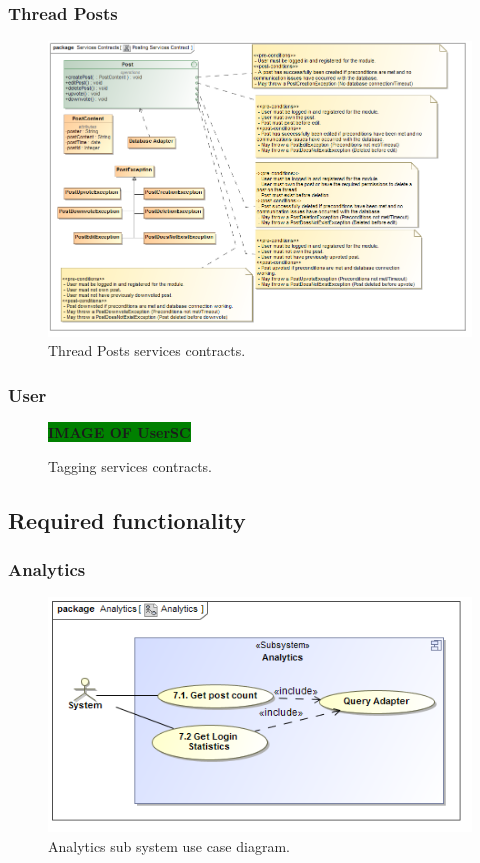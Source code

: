 \documentclass [a4paper,12pt] {article}
\begin{document}
		\subsubsection{Thread Posts}
		\begin{figure}[H]
			\centering
			\includegraphics[width=1.0\textwidth]{ThreadPostsSC.png}
			\caption{Thread Posts services contracts.}
		\end{figure}	
		\subsubsection{User}
			\begin{figure}[H]
				\centering
				\large\textbf{\colorbox{green}{IMAGE OF UserSC}}
				\caption{Tagging services contracts.}
			\end{figure}
\pagebreak
	\subsection{Required functionality}
		\subsubsection{Analytics}
			\begin{figure}[H]
				\centering
				\includegraphics[width=1.0\textwidth]{AnalyticsUC.png}
				\caption{Analytics sub system use case diagram.}
			\end{figure}
\end{document}
